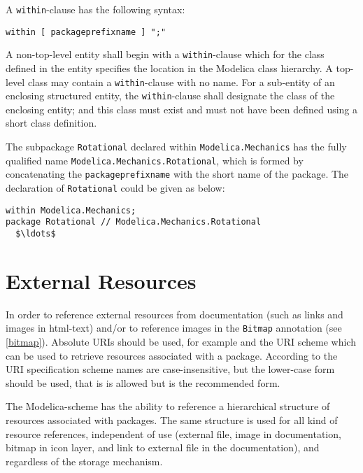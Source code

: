 A \lstinline!within!-clause has the following syntax:
\begin{lstlisting}[language=grammar]
  within [ packageprefixname ] ";"
\end{lstlisting}%
A non-top-level entity shall begin with a \lstinline!within!-clause which for the class defined in the entity specifies the location in the Modelica class hierarchy.
A top-level class may contain a \lstinline!within!-clause with no name.
For a sub-entity of an enclosing structured entity, the \lstinline!within!-clause shall designate the class of the enclosing entity; and this class must exist and must not have been defined using a short class definition.

\begin{example}
The subpackage \lstinline!Rotational! declared within \lstinline!Modelica.Mechanics! has the fully qualified name \lstinline!Modelica.Mechanics.Rotational!, which is formed by concatenating the \lstinline[language=grammar]!packageprefixname! with the short name of the package.
The declaration of \lstinline!Rotational! could be given as below:
\begin{lstlisting}[language=modelica]
within Modelica.Mechanics;
package Rotational // Modelica.Mechanics.Rotational
  $\ldots$
\end{lstlisting}
\end{example}


\section{External Resources}\label{external-resources}

In order to reference external resources from documentation (such as links and images in html-text) and/or to reference images in the \lstinline!Bitmap! annotation (see \cref{bitmap}).
Absolute URIs should be used, for example  and the URI scheme  which can be used to retrieve resources associated with a package.
According to the URI specification scheme names are case-insensitive, but the lower-case form should be used, that is  is allowed but  is the recommended form.

The Modelica-scheme has the ability to reference a hierarchical structure of resources associated with packages.
The same structure is used for all kind of resource references, independent of use (external file, image in documentation, bitmap in icon layer, and link to external file in the documentation), and regardless of the storage mechanism.

